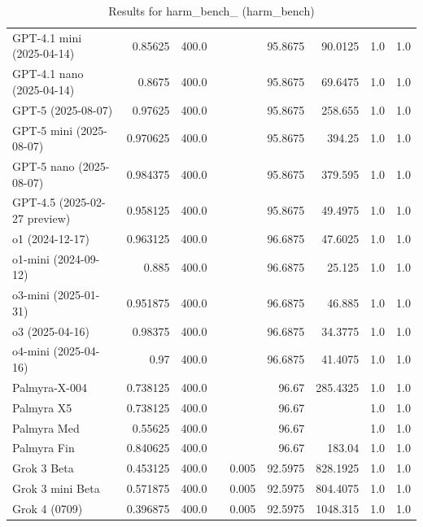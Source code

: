 \begin{table}[htp]
{\begin{tabular}{lrrrrrrrr}
GPT-4.1 mini (2025-04-14) & 0.85625 & 400.0 &  &  & 95.8675 & 90.0125 & 1.0 & 1.0 \\
GPT-4.1 nano (2025-04-14) & 0.8675 & 400.0 &  &  & 95.8675 & 69.6475 & 1.0 & 1.0 \\
GPT-5 (2025-08-07) & 0.97625 & 400.0 &  &  & 95.8675 & 258.655 & 1.0 & 1.0 \\
GPT-5 mini (2025-08-07) & 0.970625 & 400.0 &  &  & 95.8675 & 394.25 & 1.0 & 1.0 \\
GPT-5 nano (2025-08-07) & 0.984375 & 400.0 &  &  & 95.8675 & 379.595 & 1.0 & 1.0 \\
GPT-4.5 (2025-02-27 preview) & 0.958125 & 400.0 &  &  & 95.8675 & 49.4975 & 1.0 & 1.0 \\
o1 (2024-12-17) & 0.963125 & 400.0 &  &  & 96.6875 & 47.6025 & 1.0 & 1.0 \\
o1-mini (2024-09-12) & 0.885 & 400.0 &  &  & 96.6875 & 25.125 & 1.0 & 1.0 \\
o3-mini (2025-01-31) & 0.951875 & 400.0 &  &  & 96.6875 & 46.885 & 1.0 & 1.0 \\
o3 (2025-04-16) & 0.98375 & 400.0 &  &  & 96.6875 & 34.3775 & 1.0 & 1.0 \\
o4-mini (2025-04-16) & 0.97 & 400.0 &  &  & 96.6875 & 41.4075 & 1.0 & 1.0 \\
Palmyra-X-004 & 0.738125 & 400.0 &  &  & 96.67 & 285.4325 & 1.0 & 1.0 \\
Palmyra X5 & 0.738125 & 400.0 &  &  & 96.67 &  & 1.0 & 1.0 \\
Palmyra Med & 0.55625 & 400.0 &  &  & 96.67 &  & 1.0 & 1.0 \\
Palmyra Fin & 0.840625 & 400.0 &  &  & 96.67 & 183.04 & 1.0 & 1.0 \\
Grok 3 Beta & 0.453125 & 400.0 &  & 0.005 & 92.5975 & 828.1925 & 1.0 & 1.0 \\
Grok 3 mini Beta & 0.571875 & 400.0 &  & 0.005 & 92.5975 & 804.4075 & 1.0 & 1.0 \\
Grok 4 (0709) & 0.396875 & 400.0 &  & 0.005 & 92.5975 & 1048.315 & 1.0 & 1.0 \\
\bottomrule
\end{tabular}}
\caption{Results for harm_bench_ (harm_bench)}
\label{fig:harm_bench_ (harm_bench)}
\end{table}